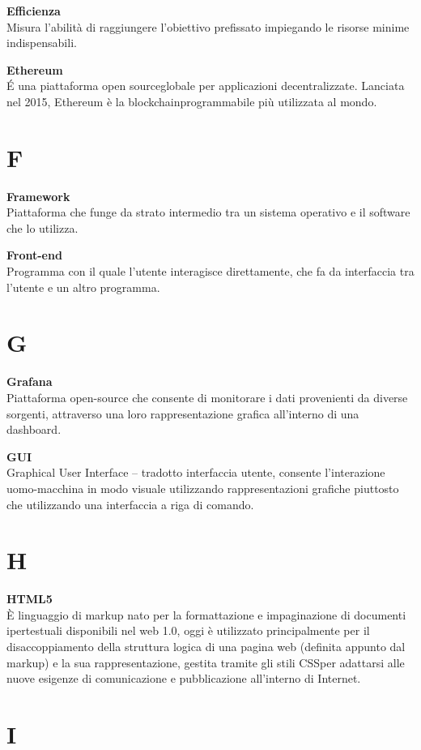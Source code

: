 \documentclass[a4paper, oneside, openany, dvipsnames, table, 12pt]{article}
\begin{document}
\textbf{Efficienza} \\
Misura l'abilità di raggiungere l'obiettivo prefissato impiegando le risorse minime indispensabili.

\textbf{Ethereum} \\
\'E una piattaforma open source\glo globale per applicazioni decentralizzate. Lanciata nel 2015, Ethereum è la blockchain\glo programmabile più utilizzata al mondo.

\newpage
\section{F}
\textbf{Framework} \\
Piattaforma che funge da strato intermedio tra un sistema operativo e il software che lo utilizza.

\label{par:frontend}
\textbf{Front-end} \\
Programma con il quale l’utente interagisce direttamente, che fa da interfaccia tra l’utente e un altro programma.

\newpage
\section{G}
\textbf{Grafana} \\
Piattaforma open-source che consente di monitorare i dati provenienti da diverse sorgenti, attraverso una loro rappresentazione grafica all'interno di una
dashboard.

\textbf{GUI} \\
Graphical User Interface – tradotto interfaccia utente, consente l’interazione uomo-macchina in modo visuale utilizzando rappresentazioni grafiche piuttosto che utilizzando una interfaccia a riga di comando.

\newpage
\section{H}
\textbf{HTML5}\\	
\`E linguaggio di markup nato per la formattazione e impaginazione di documenti ipertestuali disponibili nel web 1.0, oggi è utilizzato principalmente per il disaccoppiamento della struttura logica di una pagina web (definita appunto dal markup) e la sua rappresentazione, gestita tramite gli stili CSS\glo per adattarsi alle nuove esigenze di comunicazione e pubblicazione all'interno di Internet.

\newpage
\section{I}
\end{document}
